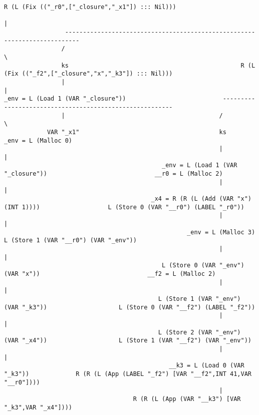 \begin{landscape}
\begin{lstlisting}[basicstyle=\fontsize{9}{10}\selectfont\ttfamily]
                                                  R (L (Fix (("_r0",["_closure","_x1"]) ::: Nil)))
                                                                         |
                 --------------------------------------------------------------------------
                /                                                                          \
                ks                                                R (L (Fix (("_f2",["_closure","x","_k3"]) ::: Nil)))
                |                                                                          |
_env = L (Load 1 (VAR "_closure"))                           --------------------------------------------------------
                |                                           /                                                        \
            VAR "_x1"                                       ks                                              _env = L (Malloc 0)
                                                            |                                                        |
                                            _env = L (Load 1 (VAR "_closure"))                              __r0 = L (Malloc 2)
                                                            |                                                        |
                                         _x4 = R (R (L (Add (VAR "x") (INT 1))))                   L (Store 0 (VAR "__r0") (LABEL "_r0"))
                                                            |                                                        |
                                                   _env = L (Malloc 3)                             L (Store 1 (VAR "__r0") (VAR "_env"))
                                                            |                                                        |
                                            L (Store 0 (VAR "_env") (VAR "x"))                              __f2 = L (Malloc 2)
                                                            |                                                        |
                                           L (Store 1 (VAR "_env") (VAR "_k3"))                    L (Store 0 (VAR "__f2") (LABEL "_f2"))
                                                            |                                                        |
                                           L (Store 2 (VAR "_env") (VAR "_x4"))                    L (Store 1 (VAR "__f2") (VAR "_env"))
                                                            |                                                        |
                                              __k3 = L (Load 0 (VAR "_k3"))             R (R (L (App (LABEL "_f2") [VAR "__f2",INT 41,VAR "__r0"])))
                                                            |
                                    R (R (L (App (VAR "__k3") [VAR "_k3",VAR "_x4"])))

\end{lstlisting}
\end{landscape}
\clearpage


